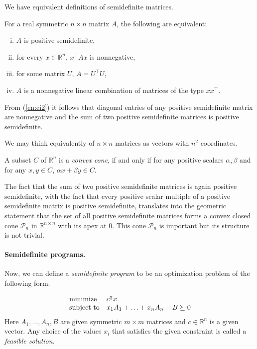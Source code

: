 We have equivalent definitions of semidefinite matrices.
\begin{theorem}
  For a real symmetric $n \times n$ matrix $A$, the following are equivalent:
  \begin{enumerate}[(i)]
    \item $A$ is positive semidefinite,
    \item \label{en:ei2} for every $x \in \mathbb{R}^n$, $x^\intercal Ax$ is nonnegative,
    \item for some matrix $U$, $A = U^\intercal U$,
    \item $A$ is a nonnegative linear combination of matrices of the type $xx^\intercal$.
  \end{enumerate}
\end{theorem}

From (\ref{en:ei2}) it follows that diagonal entries of any positive semidefinite matrix are nonnegative and the sum of two positive semidefinite matrices is positive semidefinite.

We may think equivalently of $n \times n$ matrices as vectors with $n^2$ coordinates.
\begin{defn}
  A subset $C$ of $\mathbb{R}^n$ is a \emph{convex cone}, if and only if for any positive scalars $\alpha, \beta$ and for any $x, y \in C$, $\alpha x + \beta y \in C$.
\end{defn}

The fact that the sum of two positive semidefinite matrices is again positive semidefinite, with the fact that every positive scalar multiple of a positive semidefinite matrix is positive semidefinite, translates into the geometric statement that the set of all positive semidefinite matrices forms a convex closed cone $\mathcal{P}_n$ in $\mathbb{R}^{n \times n}$ with its apex at 0. This cone $\mathcal{P}_n$ is important but its structure is not trivial.

\paragraph{Semidefinite programs.}

Now, we can define a \emph{semidefinite program} to be an optimization problem of the following form:

\begin{equation*}
  \begin{array}{ll@{}ll}
    \text{minimize}   & c^\intercal x                          & \\
    \text{subject to} & x_1A_1 + \ldots + x_nA_n - B \succeq 0   \\
  \end{array}
\end{equation*}
Here $A_1, \ldots, A_n, B$ are given symmetric $m \times m$ matrices and $c \in \mathbb{R}^n$ is a given vector. Any choice of the values $x_i$ that satisfies the given constraint is called a \emph{feasible solution}.

